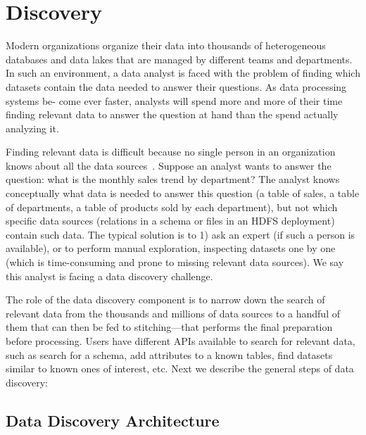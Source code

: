 \section{Discovery}
\label{sec:discovery}


Modern organizations organize their data into thousands of heterogeneous
databases and data lakes that are managed by different teams and departments. In
such an environment, a data analyst is faced with the problem of finding which
datasets contain the data needed to answer their questions. As data processing
systems be- come ever faster, analysts will spend more and more of their time
finding relevant data to answer the question at hand than the spend actually
analyzing it.

Finding relevant data is difficult because no single person in an organization
knows about all the data sources~\cite{XXX}. Suppose an analyst wants to answer the
question: what is the monthly sales trend by department? The analyst knows
conceptually what data is needed to answer this question (a table of sales, a
table of departments, a table of products sold by each department), but not
which specific data sources (relations in a schema or files in an HDFS
deployment) contain such data. The typical solution is to 1) ask an expert (if
such a person is available), or to perform manual exploration, inspecting
datasets one by one (which is time-consuming and prone to missing relevant data
sources). We say this analyst is facing a data discovery challenge.

The role of the data discovery component is to narrow down the search of
relevant data from the thousands and millions of data sources to a handful of
them that can then be fed to stitching---that performs the final preparation
before processing. Users have different APIs available to search for relevant
data, such as search for a schema, add attributes to a known tables, find
datasets similar to known ones of interest, etc. Next we describe the general
steps of data discovery:

\subsection{Data Discovery Architecture}

